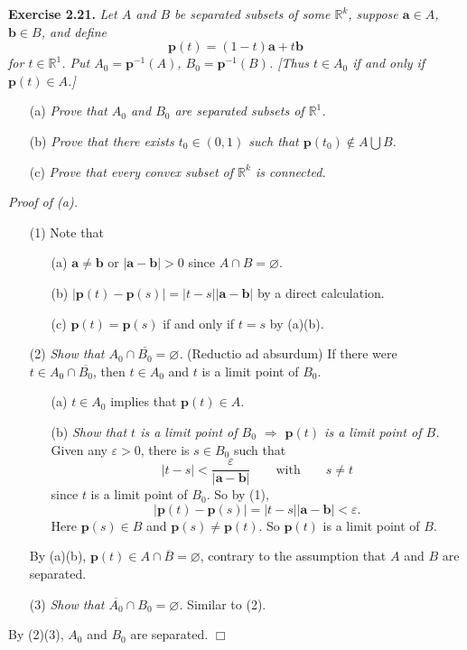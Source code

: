\documentclass{article}
\begin{document}
\textbf{Exercise 2.21.}
\emph{Let $A$ and $B$ be separated subsets of some $\mathbb{R}^k$,
suppose $\mathbf{a} \in A$, $\mathbf{b} \in B$, and define
$$\mathbf{p}(t) = (1-t)\mathbf{a} + t\mathbf{b}$$
for $t \in \mathbb{R}^1$.
Put $A_0 = \mathbf{p}^{-1}(A)$,
$B_0 = \mathbf{p}^{-1}(B)$.
[Thus $t \in A_0$ if and only if $\mathbf{p}(t) \in A$.]}
\begin{enumerate}
\item[(a)]
\emph{Prove that $A_0$ and $B_0$ are separated subsets of $\mathbb{R}^1$.}
\item[(b)]
\emph{Prove that there exists $t_0 \in (0,1)$ such that
$\mathbf{p}(t_0) \notin A \bigcup B$.}
\item[(c)]
\emph{Prove that every convex subset of $\mathbb{R}^k$ is connected.} \\
\end{enumerate}

\emph{Proof of (a).}
\begin{enumerate}
\item[(1)]
Note that
  \begin{enumerate}
  \item[(a)]
  $\mathbf{a} \neq \mathbf{b}$ or $|\mathbf{a} - \mathbf{b}| > 0$
  since $A \cap B = \varnothing$.
  \item[(b)]
  $|\mathbf{p}(t) - \mathbf{p}(s)| = |t-s||\mathbf{a} - \mathbf{b}|$
  by a direct calculation.
  \item[(c)]
  $\mathbf{p}(t) = \mathbf{p}(s)$ if and only if $t = s$ by (a)(b).
  \end{enumerate}
\item[(2)]
\emph{Show that $A_0 \cap \overline{B_0} = \varnothing$.}
(Reductio ad absurdum)
If there were $t \in A_0 \cap \overline{B_0}$,
then $t \in A_0$ and $t$ is a limit point of $B_0$.
  \begin{enumerate}
  \item[(a)]
  $t \in A_0$ implies that $\mathbf{p}(t) \in A$.
  \item[(b)]
  \emph{Show that $t$ is a limit point of $B_0$ $\Longrightarrow$
  $\mathbf{p}(t)$ is a limit point of $B$.}
  Given any $\varepsilon > 0$,
  there is $s \in B_0$ such that
  $$|t-s| < \frac{\varepsilon}{|\mathbf{a} - \mathbf{b}|}
  \qquad \text{with} \qquad s \neq t$$
  since $t$ is a limit point of $B_0$.
  So by (1),
  $$|\mathbf{p}(t) - \mathbf{p}(s)| = |t-s||\mathbf{a} - \mathbf{b}|
  < \varepsilon.$$
  Here $\mathbf{p}(s) \in B$ and $\mathbf{p}(s) \neq \mathbf{p}(t)$.
  So $\mathbf{p}(t)$ is a limit point of $B$.
  \end{enumerate}
  By (a)(b), $\mathbf{p}(t) \in A \cap \overline{B} = \varnothing$,
  contrary to the assumption that $A$ and $B$ are separated.
\item[(3)]
\emph{Show that $\overline{A_0} \cap B_0 = \varnothing$.}
Similar to (2).
\end{enumerate}
By (2)(3), $A_0$ and $B_0$ are separated.
$\Box$ \\
\end{document}
